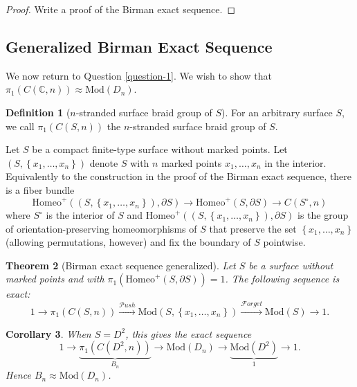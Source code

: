 \documentclass[reqno]{amsart}
\newtheorem{theorem}{Theorem}[section]
\newtheorem{corollary}[theorem]{Corollary}
\theoremstyle{definition}
\newtheorem{definition}[theorem]{Definition}
\theoremstyle{remark}
\newcommand{\Mod}{{\mathrm{Mod}}}
\newcommand{\Homeo}{{\mathrm{Homeo}}}
\newcommand{\Push}{{\mathcal{P}}ush}
\newcommand{\Forget}{{\mathcal{F}}orget}
\begin{document}
 \begin{proof}
     Write a proof of the Birman exact sequence.
 \end{proof}

 \subsection{Generalized Birman Exact Sequence}

 We now return to Question \ref{question-1}.
 We wish to show that $\pi_1 \left( C
 \left( \mathbb{C},n \right) \right) \approx
 \Mod \left( D_n \right) $. 

 \begin{definition}[$n$-stranded surface braid group of
     $S$]
     For an arbitrary surface $S$, we
     call $\pi_1 \left( C \left( S,n \right)  \right) $ 
     the $n$-stranded surface braid group of $S$.
 \end{definition}

 Let $S$ be a compact finite-type surface without marked
 points. Let $\left( S, \left\{ x_1, \ldots, x_n \right\}  \right) $ 
 denote $S$ with $n$ marked points $x_1, \ldots, x_n$ in
 the interior. Equivalently to the construction
 in the proof of the Birman exact sequence,
 there is a fiber bundle
 \[
 \Homeo^{+} \left( \left( S,
 \left\{ x_1, \ldots, x_n \right\} \right), \partial S  \right) 
 \to \Homeo^{+} \left( S, \partial S \right) 
 \to C \left( S^{\circ},n \right) 
 \]
 where $S^{\circ}$ is the interior of
 $S$ and $\Homeo^{+} \left( \left( S,
 \left\{ x_1,\ldots,x_n \right\} \right) ,\partial S \right) $ 
 is the group of orientation-preserving homeomorphisms
 of $S$ that preserve the set
 $\left\{ x_1,\ldots,x_n \right\} $ (allowing permutations,
 however) and fix the boundary of $S$ pointwise.

 \begin{theorem}[Birman exact sequence generalized]
     Let $S$ be a surface without marked points
     and with $\pi_1 \left( \Homeo^{+} \left( 
     S, \partial S\right)  \right) = 1$. The following
     sequence is exact:
     \[
     1 \to \pi_1 \left( C \left( S,n \right)  \right) 
     \stackrel{\Push}{\to } \Mod \left( S,
     \left\{ x_1, \ldots, x_n \right\} \right) 
     \stackrel{\Forget}{\to } \Mod (S) \to 1.
     \] 
 \end{theorem}


 \begin{corollary}
     When $S = D^2$, this gives the exact sequence
     \[
         1 \to
         \underbrace{\pi_1 \left( C \left( D^2,n \right)\right)}_{B_n}
     \to \Mod \left( D_n \right) \to 
     \underbrace{\Mod \left( D^2 \right)}_{1} \to 1.
     \] 
     Hence $B_n \approx \Mod \left( D_n \right) $.
 \end{corollary}
\end{document}
